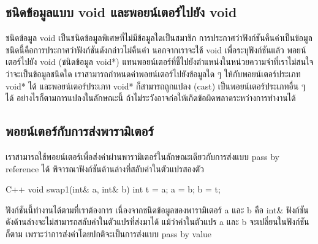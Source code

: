 \subsection{ชนิด{\wbr}ข้อมูล{\wbr}แบบ {\ct void} และ{\wbr}พอยน์เตอร์{\wbr}ไป{\wbr}ยัง {\ct void}}

ชนิด{\wbr}ข้อมูล {\ct void} เป็น{\wbr}ชนิด{\wbr}ข้อมูล{\wbr}พิเศษ{\wbr}ที่{\wbr}ไม่{\wbr}มี{\wbr}ข้อมูล{\wbr}ใด{\wbr}เป็น{\wbr}สมาชิก{\wbr}
การ{\wbr}ประกาศ{\wbr}ว่า{\wbr}ฟังก์ชัน{\wbr}คืน{\wbr}ค่า{\wbr}เป็น{\wbr}ข้อมูล{\wbr}ชนิด{\wbr}นี้{\wbr}คือ{\wbr}การ{\wbr}ประกาศ{\wbr}ว่า{\wbr}ฟังก์ชัน{\wbr}ดัง{\wbr}กล่าว{\wbr}ไม่{\wbr}คืน{\wbr}ค่า{\wbr}
นอกจาก{\wbr}เรา{\wbr}จะ{\wbr}ใช้ {\ct void} เพื่อ{\wbr}ระบุ{\wbr}ฟังก์ชัน{\wbr}แล้ว พอยน์เตอร์ไป{\wbr}ยัง {\ct void}
(ชนิด{\wbr}ข้อมูล {\ct void*})
แทน{\wbr}พอยน์เตอร์{\wbr}ที่{\wbr}ชี้{\wbr}ไป{\wbr}ยัง{\wbr}ตำแหน่ง{\wbr}ใน{\wbr}หน่วย{\wbr}ความ{\wbr}จำ{\wbr}ที่{\wbr}เรา{\wbr}ไม่{\wbr}สนใจ{\wbr}ว่า{\wbr}จะ{\wbr}เป็น{\wbr}ข้อมูล{\wbr}ชนิด{\wbr}ใด{\wbr}
เรา{\wbr}สามารถ{\wbr}กำหนด{\wbr}ค่า{\wbr}พอยน์เตอร์{\wbr}ไป{\wbr}ยัง{\wbr}ข้อมูล{\wbr}ใด ๆ ให้{\wbr}กับ{\wbr}พอยน์เตอร์{\wbr}ประเภท {\ct void*} ได้{\wbr}
และ{\wbr}พอยน์เตอร์{\wbr}ประเภท {\ct void*} ก็{\wbr}สามารถ{\wbr}ถูก{\wbr}แปลง (cast) เป็น{\wbr}พอยน์เตอร์{\wbr}ประเภท{\wbr}อื่น{\wbr}
ๆ ได้ อย่างไร{\wbr}ก็{\wbr}ตาม{\wbr}การ{\wbr}แปลง{\wbr}ใน{\wbr}ลักษณะ{\wbr}นี้{\wbr}
ถ้า{\wbr}ไม่{\wbr}ระวัง{\wbr}อาจ{\wbr}ก่อ{\wbr}ให้{\wbr}เกิด{\wbr}ข้อ{\wbr}ผิดพลาด{\wbr}ระหว่าง{\wbr}การ{\wbr}ทำงาน{\wbr}ได้{\wbr}


\subsection{พอยน์เตอร์กับ{\wbr}การ{\wbr}ส่ง{\wbr}พารามิเตอร์}
เรา{\wbr}สามารถ{\wbr}ใช้{\wbr}พอยน์เตอร์{\wbr}เพื่อ{\wbr}ส่ง{\wbr}ค่า{\wbr}ผ่าน{\wbr}พารามิเตอร์{\wbr}ใน{\wbr}ลักษณะ{\wbr}เดียว{\wbr}กับ{\wbr}การ{\wbr}ส่ง{\wbr}แบบ pass by
reference ได้ พิจารณา{\wbr}ฟังก์ชัน{\wbr}ด้าน{\wbr}ล่าง{\wbr}ที่{\wbr}สลับ{\wbr}ค่า{\wbr}ใน{\wbr}ตัวแปร{\wbr}สอง{\wbr}ตัว{\wbr}

\latintext
\begin{codelist}{C++}{}
void swap1(int& a, int& b)
{
  int t = a;
  a = b;
  b = t;
}
\end{codelist}
\thaitext

ฟังก์ชัน{\wbr}นี้{\wbr}ทำงาน{\wbr}ได้{\wbr}ตาม{\wbr}ที่{\wbr}เรา{\wbr}ต้องการ เนื่อง{\wbr}จาก{\wbr}ชนิด{\wbr}ข้อมูล{\wbr}ของ{\wbr}พารามิเตอร์ {\ct a} และ {\ct
  b} คือ {\ct int\&} ฟังก์ชัน{\wbr}ดัง{\wbr}ด้าน{\wbr}ล่าง{\wbr}จะ{\wbr}ไม่{\wbr}สามารถ{\wbr}สลับ{\wbr}ค่า{\wbr}ใน{\wbr}ตัวแปร{\wbr}ที่{\wbr}ส่ง{\wbr}มา{\wbr}ได้{\wbr}
แม้{\wbr}ว่า{\wbr}ค่า{\wbr}ใน{\wbr}ตัวแปร {\ct a} และ {\ct b} จะ{\wbr}เปลี่ยน{\wbr}ใน{\wbr}ฟังก์ชัน{\wbr}ก็{\wbr}ตาม{\wbr}
เพราะ{\wbr}ว่า{\wbr}การ{\wbr}ส่ง{\wbr}ค่า{\wbr}โดย{\wbr}ปกติ{\wbr}จะ{\wbr}เป็น{\wbr}การ{\wbr}ส่ง{\wbr}แบบ pass by value

